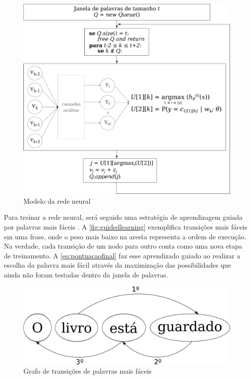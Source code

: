 \begin{figure}[htb]
    \caption{Modelo da rede neural}\label{fig:neuralnetworkfinal}
    \begin{center}
        \includegraphics[scale=0.25]{img/neuralnetworkfinal_alg.pdf}
    \end{center}
\end{figure}

Para treinar a rede neural, será seguido uma estratégia de aprendizagem guiada por palavras mais fáceis \cite{shen2007guided}. A \autoref{fig:guidedlearning} exemplifica transições mais fáceis em uma frase, onde o peso mais baixo na aresta representa a ordem de execução. Na verdade, cada transição de um nodo para outro conta como uma nova etapa de treinamento. A \autoref{eq:pontuacaofinal} faz esse aprendizado guiado ao realizar a escolha da palavra mais fácil através da maximização das possibilidades que ainda não foram testadas dentro da janela de palavras.

\begin{figure}[htb]
	  \caption{Grafo de transições de palavras mais fáceis}\label{fig:guidedlearning}
	  \begin{center}
	      \includegraphics[scale=0.3]{img/guidedlearning.pdf}
	  \end{center}
\end{figure}

